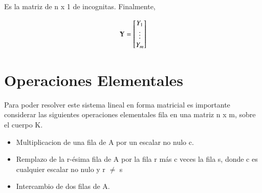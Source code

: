 \documentclass[12pt]{article}
\begin{document}
Es la matriz de n x 1 de incognitas. Finalmente,

\[
\varmathbb{Y} = \begin{bmatrix}
	Y_{1} \\
    \vdots \\
   Y_{m}  \\
\end{bmatrix}
\]

\section{Operaciones Elementales}

Para poder resolver este sistema lineal en forma matricial es importante considerar las siguientes operaciones elementales fila en una matriz n x m, sobre el cuerpo K. 

\begin{itemize}
\item Multiplicacion de una fila de A por un escalar no nulo c.
\item Remplazo de la r-\'esima fila de A por la fila r m\'as c veces la fila s, donde c es cualquier escalar no nulo y r $\neq$ s
\item Intercambio de dos filas de A. 
\end{itemize}

 
\end{document}
